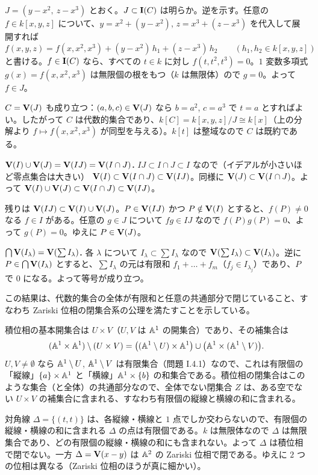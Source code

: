 $J=(y-x^2,\ z-x^3)$ とおく。$J\subset\mathbf{I}(C)$ は明らか。逆を示す。任意の $f\in k[x,y,z]$ について、$y=x^2+(y-x^2)$, $z=x^3+(z-x^3)$ を代入して展開すれば
\[
  f(x,y,z)=f(x,x^2,x^3)+(y-x^2)\,h_1+(z-x^3)\,h_2\qquad(h_1,h_2\in k[x,y,z])
\]
と書ける。$f\in\mathbf{I}(C)$ なら、すべての $t\in k$ に対し $f(t,t^2,t^3)=0$。$1$ 変数多項式 $g(x)=f(x,x^2,x^3)$ は無限個の根をもつ（$k$ は無限体）ので $g=0$。よって $f\in J$。

$C=\mathbf{V}(J)$ も成り立つ：$(a,b,c)\in\mathbf{V}(J)$ なら $b=a^2$, $c=a^3$ で $t=a$ とすればよい。したがって $C$ は代数的集合であり、$k[C]=k[x,y,z]/J\cong k[x]$（上の分解より $f\mapsto f(x,x^2,x^3)$ が同型を与える）。$k[t]$ は整域なので $C$ は既約である。

\textbf{$\mathbf{V}(I)\cup\mathbf{V}(J)=\mathbf{V}(IJ)=\mathbf{V}(I\cap J)$.}
$IJ\subset I\cap J\subset I$ なので（イデアルが小さいほど零点集合は大きい）
$\mathbf{V}(I)\subset\mathbf{V}(I\cap J)\subset\mathbf{V}(IJ)$。同様に $\mathbf{V}(J)\subset\mathbf{V}(I\cap J)$。よって
$\mathbf{V}(I)\cup\mathbf{V}(J)\subset\mathbf{V}(I\cap J)\subset\mathbf{V}(IJ)$。

残りは $\mathbf{V}(IJ)\subset\mathbf{V}(I)\cup\mathbf{V}(J)$。$P\in\mathbf{V}(IJ)$ かつ $P\notin\mathbf{V}(I)$ とすると、$f(P)\neq0$ なる $f\in I$ がある。任意の $g\in J$ について $fg\in IJ$ なので $f(P)g(P)=0$、よって $g(P)=0$。ゆえに $P\in\mathbf{V}(J)$。

\textbf{$\bigcap\mathbf{V}(I_\lambda)=\mathbf{V}(\sum I_\lambda)$.}
各 $\lambda$ について $I_\lambda\subset\sum I_\lambda$ なので $\mathbf{V}(\sum I_\lambda)\subset\mathbf{V}(I_\lambda)$。逆に $P\in\bigcap\mathbf{V}(I_\lambda)$ とすると、$\sum I_\lambda$ の元は有限和 $f_1+\dots+f_m$（$f_j\in I_{\lambda_j}$）であり、$P$ で $0$ になる。よって等号が成り立つ。

この結果は、代数的集合の全体が有限和と任意の共通部分で閉じていること、すなわち Zariski 位相の閉集合系の公理を満たすことを示している。

積位相の基本開集合は $U\times V$（$U,V$ は $\mathbb{A}^1$ の開集合）であり、その補集合は
\[
  (\mathbb{A}^1\times\mathbb{A}^1)\setminus(U\times V)=\bigl((\mathbb{A}^1\setminus U)\times\mathbb{A}^1\bigr)\cup\bigl(\mathbb{A}^1\times(\mathbb{A}^1\setminus V)\bigr).
\]
$U,V\neq\emptyset$ なら $\mathbb{A}^1\setminus U$, $\mathbb{A}^1\setminus V$ は有限集合（問題 I.4.1）なので、これは有限個の「縦線」$\{a\}\times\mathbb{A}^1$ と「横線」$\mathbb{A}^1\times\{b\}$ の和集合である。積位相の閉集合はこのような集合（と全体）の共通部分なので、全体でない閉集合 $Z$ は、ある空でない $U\times V$ の補集合に含まれる、すなわち有限個の縦線と横線の和に含まれる。

対角線 $\Delta=\{(t,t)\}$ は、各縦線・横線と $1$ 点でしか交わらないので、有限個の縦線・横線の和に含まれる $\Delta$ の点は有限個である。$k$ は無限体なので $\Delta$ は無限集合であり、どの有限個の縦線・横線の和にも含まれない。よって $\Delta$ は積位相で閉でない。一方 $\Delta=\mathbf{V}(x-y)$ は $\mathbb{A}^2$ の Zariski 位相で閉である。ゆえに $2$ つの位相は異なる（Zariski 位相のほうが真に細かい）。

